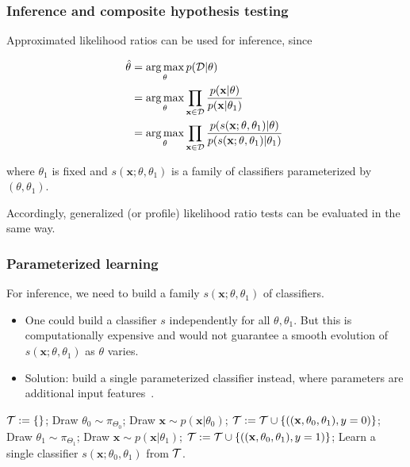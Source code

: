 \documentclass{beamer}
\DeclareMathOperator*{\argmax}{arg\,max}
\let\oldcitep=\citep
\renewcommand\citep[1]{\hyperlink{#1}{\oldcitep{#1}}}
\begin{document}
\begin{frame}
    \frametitle{Inference and composite hypothesis testing}

    Approximated likelihood ratios can be used for inference, since

    {\small
    \begin{align}\label{eqn:mle}
        \hat{\theta} &= \argmax_\theta  p({\cal D} | \theta) \nonumber \\
                     &= \argmax_\theta  \prod_{\mathbf{x} \in {\cal D}} \frac{p(\mathbf{x}| \theta)}{p(\mathbf{x}|\theta_1)} \nonumber \\
                     &= \argmax_\theta  \prod_{\mathbf{x} \in {\cal D}} \frac{p(s(\mathbf{x}; \theta, \theta_1) | \theta)}{p(s(\mathbf{x}; \theta, \theta_1) |\theta_1)} \;
    \end{align}}

    where $\theta_1$ is fixed and $s(\mathbf{x}; \theta, \theta_1)$ is a family of classifiers parameterized by $(\theta, \theta_1)$.

    \vspace{1em}

    Accordingly, generalized (or profile) likelihood ratio tests can be evaluated in the same way.
\end{frame}

\begin{frame}
    \frametitle{Parameterized learning}

    For inference, we need to build a family $s(\mathbf{x}; \theta, \theta_1)$ of classifiers.

    \begin{itemize}
        \item One could build a classifier $s$ independently for all $\theta, \theta_1$. But this is computationally expensive and would not guarantee a smooth evolution of $s(\mathbf{x}; \theta, \theta_1)$ as $\theta$ varies.

        \item Solution: build a single parameterized classifier instead, where parameters are additional input features~\citep{cranmer2015approximating,Baldi:2016fzo}.
    \end{itemize}

    {\scriptsize
    \begin{algorithmic}
        \State ${\cal T := \{ \}}$;
            \State Draw $\theta_0 \sim \pi_{\Theta_0}$;
    	    \State Draw $\mathbf{x} \sim p(\mathbf{x}|\theta_0)$;
    		\State ${\cal T} := {\cal T} \cup \{ ((\mathbf{x}, \theta_0, \theta_1), y=0) \}$;
            \State Draw $\theta_1 \sim \pi_{\Theta_1}$;
    		\State Draw $\mathbf{x} \sim p(\mathbf{x}|\theta_1)$;
    		\State ${\cal T} := {\cal T} \cup \{ ((\mathbf{x}, \theta_0, \theta_1), y=1) \}$;
        \EndWhile
        \State Learn a single classifier $s(\mathbf{x}; \theta_0, \theta_1)$ from ${\cal T}$.
    \end{algorithmic}}

\end{frame}
\end{document}
